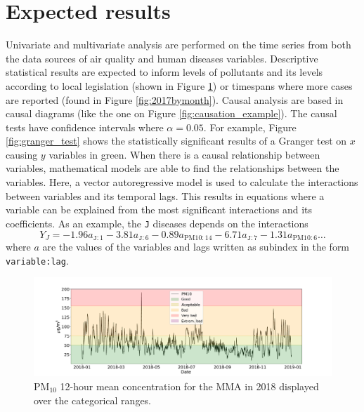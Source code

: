 \documentclass[
  11pt,
  a4paper,
  oneside
]{article}
\begin{document}
\section{Expected results}
Univariate and multivariate analysis are performed on the time series from both the data sources of air quality and human diseases variables. Descriptive statistical results are expected to inform levels of pollutants and its levels according to local legislation (shown in Figure \ref{fig:ts_2018_pm10}) or timespans where more cases are reported (found in Figure \ref{fig:2017bymonth}). Causal analysis are based in causal diagrams (like the one on Figure \ref{fig:causation_example}). The causal tests have confidence intervals where $\alpha = 0.05$. For example, Figure \ref{fig:granger_test} shows the statistically significant results of a Granger test on $x$ causing $y$ variables in green. When there is a causal relationship between variables, mathematical models are able to find the relationships between the variables. Here, a vector autoregressive model is used to calculate the interactions between variables and its temporal lags. This results in equations where a variable can be explained from the most significant interactions and its coefficients. As an example, the \texttt{J} diseases depends on the interactions
\begin{equation*}
    Y_J = -1.96 a_{\texttt{J}:1} -3.81 a_{\texttt{J}:6} -0.89 a_{\text{PM10}:14} -6.71 a_{\texttt{J}:7} -1.31 a_{\text{PM10}:6} \ldots
\end{equation*}
where $a$ are the values of the variables and lags written as subindex in the form \texttt{variable:lag}.

\begin{figure}
    \centering
    \includegraphics[width=1\textwidth]{figs/ts_2018_pm10.pdf}
    \caption{PM$_{10}$ 12-hour mean concentration for the MMA in 2018 displayed over the categorical ranges.}
    \label{fig:ts_2018_pm10}
\end{figure}
\end{document}
